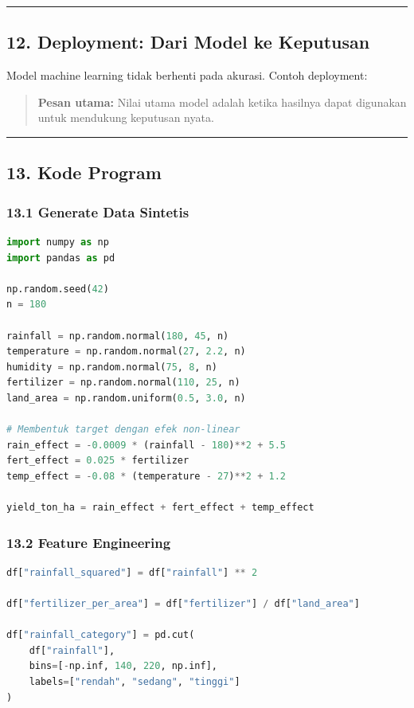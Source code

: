 \documentclass[12pt,a4paper]{article}
\begin{document}
\hrule


\subsection{12. Deployment: Dari Model ke Keputusan}

Model machine learning tidak berhenti pada akurasi. Contoh deployment:



\begin{quote}
\textbf{Pesan utama:} Nilai utama model adalah ketika hasilnya dapat digunakan untuk mendukung keputusan nyata.\end{quote}


\hrule


\subsection{13. Kode Program}

\subsubsection{13.1 Generate Data Sintetis}

\begin{lstlisting}[language=Python]
import numpy as np
import pandas as pd

np.random.seed(42)
n = 180

rainfall = np.random.normal(180, 45, n)
temperature = np.random.normal(27, 2.2, n)
humidity = np.random.normal(75, 8, n)
fertilizer = np.random.normal(110, 25, n)
land_area = np.random.uniform(0.5, 3.0, n)

# Membentuk target dengan efek non-linear
rain_effect = -0.0009 * (rainfall - 180)**2 + 5.5
fert_effect = 0.025 * fertilizer
temp_effect = -0.08 * (temperature - 27)**2 + 1.2

yield_ton_ha = rain_effect + fert_effect + temp_effect
\end{lstlisting}

\subsubsection{13.2 Feature Engineering}

\begin{lstlisting}[language=Python]
df["rainfall_squared"] = df["rainfall"] ** 2

df["fertilizer_per_area"] = df["fertilizer"] / df["land_area"]

df["rainfall_category"] = pd.cut(
    df["rainfall"],
    bins=[-np.inf, 140, 220, np.inf],
    labels=["rendah", "sedang", "tinggi"]
)
\end{lstlisting}
\end{document}
